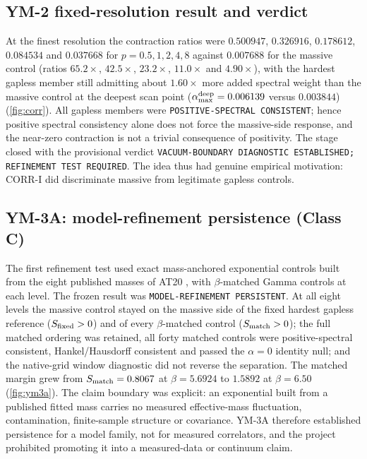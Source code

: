 \documentclass[11pt,a4paper]{article}
\theoremstyle{definition}
\theoremstyle{remark}
\begin{document}
\subsection{YM-2 fixed-resolution result and verdict}
At the finest resolution the contraction ratios were $0.500947$, $0.326916$, $0.178612$, $0.084534$ and $0.037668$ for $p=0.5,1,2,4,8$ against $0.007688$ for the massive control (ratios $65.2\times$, $42.5\times$, $23.2\times$, $11.0\times$ and $4.90\times$), with the hardest gapless member still admitting about $1.60\times$ more added spectral weight than the massive control at the deepest scan point ($\alpha_{\max}^{\rm deep}=0.006139$ versus $0.003844$) (\cref{fig:corr}). All gapless members were \texttt{POSITIVE-\allowbreak{}SPECTRAL CONSISTENT}; hence positive spectral consistency alone does not force the massive-side response, and the near-zero contraction is not a trivial consequence of positivity. The stage closed with the provisional verdict \texttt{VACUUM-\allowbreak{}BOUNDARY DIAGNOSTIC ESTABLISHED; REFINEMENT TEST REQUIRED}. The idea thus had genuine empirical motivation: CORR-I did discriminate massive from legitimate gapless controls.

\subsection{YM-3A: model-refinement persistence (Class C)}
The first refinement test used exact mass-anchored exponential controls built from the eight published masses of AT20 \cite{AT20}, with $\beta$-matched Gamma controls at each level. The frozen result was \texttt{MODEL-\allowbreak{}REFINEMENT PERSISTENT}. At all eight levels the massive control stayed on the massive side of the fixed hardest gapless reference ($S_{\rm fixed}>0$) and of every $\beta$-matched control ($S_{\rm match}>0$); the full matched ordering was retained, all forty matched controls were positive-spectral consistent, Hankel/Hausdorff consistent and passed the $\alpha=0$ identity null; and the native-grid window diagnostic did not reverse the separation. The matched margin grew from $S_{\rm match}=0.8067$ at $\beta=5.6924$ to $1.5892$ at $\beta=6.50$ (\cref{fig:ym3a}). The claim boundary was explicit: an exponential built from a published fitted mass carries no measured effective-mass fluctuation, contamination, finite-sample structure or covariance. YM-3A therefore established persistence for a model family, not for measured correlators, and the project prohibited promoting it into a measured-data or continuum claim.
\end{document}
